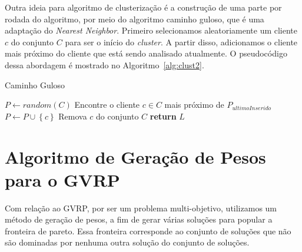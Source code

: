 \documentclass[12pt, a4paper]{article}
\begin{document}
Outra ideia para algoritmo de clusterização é a construção de uma parte por rodada do algoritmo, por meio do algoritmo caminho guloso, que é uma adaptação do \textit{Nearest Neighbor}. Primeiro selecionamos aleatoriamente um cliente $c$ do conjunto $C$ para ser o início do \textit{cluster}. A partir disso, adicionamos o cliente mais próximo do cliente que está sendo analisado atualmente. O pseudocódigo dessa abordagem é mostrado no Algoritmo~\ref{alg:clust2}.
%
\begin{algorithm}[htb!]
  \caption{Caminho Guloso}\label{alg:clust2}
  \begin{algorithmic}[1]
      \State $P \gets random(C)$
        \State Encontre o cliente $c \in C$ mais próximo de $P_{ultimoInserido}$
        \State $P\gets P \cup \left\{c\right\}$
        \State Remova $c$ do conjunto $C$
       \EndWhile
      \State \textbf{return} $L$
    \EndFunction
  \end{algorithmic}
\end{algorithm}


\section{Algoritmo de Geração de Pesos para o GVRP}\label{sec:algorithms_GVRP}

Com relação ao GVRP, por ser um problema multi-objetivo, utilizamos um método de geração de pesos, a fim de gerar várias soluções para popular a fronteira de pareto. Essa fronteira corresponde ao conjunto de soluções que não são dominadas por nenhuma outra solução do conjunto de soluções.
\end{document}
